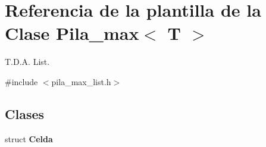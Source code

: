 \section{Referencia de la plantilla de la Clase Pila\+\_\+max$<$ T $>$}
\label{classPila__max}


T.\+D.\+A. List.  




{\ttfamily \#include $<$pila\+\_\+max\+\_\+list.\+h$>$}

\subsection*{Clases}
\begin{DoxyCompactItemize}
\item 
struct {\bf Celda}
\end{DoxyCompactItemize}
